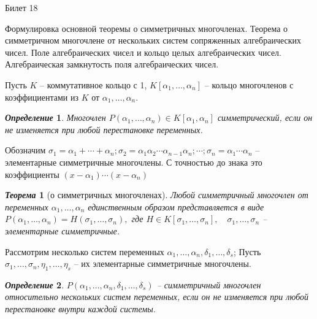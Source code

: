 \documentclass[a4paper,12pt]{article}
\newtheorem{deff}{\textit{Определение}}
\newtheorem{teo}{\textit{Теорема}}
\newcommand{\AL}{\alpha}
\newcommand{\q}{\quad}
\begin{document}
\newpage
\begin{mybox2}{\hypertarget{bil18}{Билет 18}}

\begin{formbox}{}
Формулировка основной теоремы о симметричных многочленах. Теорема о симметричном многочлене от нескольких систем сопряженных алгебраических чисел. Поле алгебраических чисел и кольцо целых алгебраических чисел. Алгебраическая замкнутость поля алгебраических чисел.
\end{formbox}
Пусть $K$ -- коммутативное кольцо с 1, $K[\AL_1, \dots, \AL_n]$ -- кольцо многочленов с коэффициентами из $K$ от $\AL_1,\dots,\AL_n$.\\


\begin{formbox}{}
\begin{deff} Многочлен $P(\AL_1,\dots,\AL_n) \in K[\AL_1, \AL_n]$ симметрический, если он не изменяется при любой перестановке переменных.
\end{deff}
\end{formbox}
Обозначим $\sigma_1 = \AL_1 +\cdots + \AL_n; \sigma_2 = \AL_1\AL_2 \cdots \AL_{n-1}\AL_n; \cdots; \sigma_n = \AL_1\cdots\AL_n$ -- элементарные симметричные многочлены. С точностью до знака это коэффициенты $(x-\AL_1)\cdots(x-\AL_n)$

\begin{formbox}{}
\begin{teo} [о симметричных многочленах] Любой симметричный многочлен от переменных $\AL_1, \dots, \AL_n$  единственным образом представляется в виде $P(\AL_1,\dots,\AL_n) = H(\sigma_1, \dots, \sigma_n),$ где $H\in K[\sigma_1, \dots, \sigma_n], \q \sigma_1, \dots, \sigma_n$ -- элементарные симметричные.
\end{teo}
\end{formbox}

Рассмотрим несколько систем переменных $\AL_1,\dots,\AL_n, \delta_1,\dots,\delta_s$; Пусть $\sigma_1, \dots, \sigma_n, \eta_1,\dots,\eta_s$ -- их элементарные симметричные многочлены.

\begin{formbox}{}
\begin{deff} $P(\AL_1, \dots, \AL_n, \delta_1,\dots,\delta_s)$ -- симметричный многочлен относительно нескольких систем переменных, если он не изменяется при любой перестановке внутри каждой системы.
\end{deff}
\end{formbox}
\begin{formbox}{}


\end{formbox}
\end{mybox2}
\end{document}
